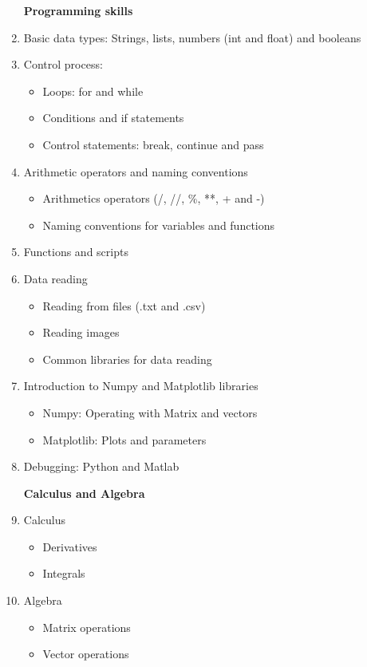 \documentclass[letter,11pt]{article}
\begin{document}
\begin{enumerate}
\vspace{0.3cm}
\Large \textbf{Programming skills} \large
    \item Basic data types: Strings, lists, numbers (int and float) and booleans
    \item Control process:
    \begin{itemize}
        \vspace{-0.3cm}
        \item Loops: for and while
        \item Conditions and if statements
        \item Control statements: break, continue and pass
    \end{itemize}
    \item Arithmetic operators and naming conventions
    \begin{itemize}
        \vspace{-0.3cm}
        \item Arithmetics operators (/, //, \%, **, + and -)
        \item Naming conventions for variables and functions
    \end{itemize}
    \item Functions and scripts
    \item Data reading
    \begin{itemize}
        \vspace{-0.3cm}
        \item Reading from files (.txt and .csv)
        \item Reading images
        \item Common libraries for data reading
    \end{itemize}
    \item Introduction to Numpy and Matplotlib libraries
    \begin{itemize}
        \vspace{-0.3cm}
        \item Numpy: Operating with Matrix and vectors
        \item Matplotlib: Plots and parameters 
    \end{itemize}
    \item Debugging: Python and Matlab
    
\vspace{0.2cm}
\Large \textbf{Calculus and Algebra} \large
    \item Calculus
    \begin{itemize}
        \vspace{-0.3cm}
        \item Derivatives
        \item Integrals
    \end{itemize}
    \item Algebra
    \begin{itemize}
        \vspace{-0.3cm}
        \item Matrix operations
        \item Vector operations
    \end{itemize}


\end{enumerate}
\end{document}

